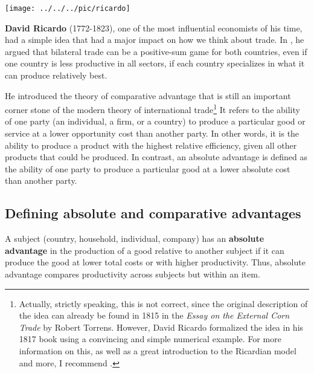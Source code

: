 	\begin{minipage}{0.4\linewidth}
		\begin{center}
			\texttt{[image: ../../../pic/ricardo]}
		\end{center}
	\end{minipage}
	\begin{minipage}{0.6\linewidth}
		\textbf{David Ricardo} (1772-1823), one of the most influential economists of his time, had a simple idea that had a major impact on how we think about trade. In \cite{Ricardo1819}, he argued that bilateral trade can be a positive-sum game for both countries, even if one country is less productive in all sectors, if each country specializes in what it can produce relatively best. 
		
		He introduced the theory of comparative advantage that is still an important corner stone of the modern theory of international trade\footnote{Actually, strictly speaking, this is not correct, since the original description of the idea can already be found in 1815 in the \textit{Essay on the External Corn Trade} by Robert Torrens. However, David Ricardo formalized the idea in his 1817 book using a convincing and simple numerical example. For more information on this, as well as a great introduction to the Ricardian model and more, I recommend \cite{Academy2012International}.} It refers to the ability of one party (an individual, a firm, or a country) to produce a particular good or service at a lower opportunity cost than another party. In other words, it is the ability to produce a product with the highest relative efficiency, given all other products that could be produced. In contrast, an absolute advantage is defined as the ability of one party to produce a particular good at a lower absolute cost than another party.
	\end{minipage}
	
\subsection{Defining absolute and comparative advantages}

A subject (country, household, individual, company) has an \textbf{absolute advantage} in the production of a good relative to another subject if it can produce the good at lower total costs or with higher productivity. Thus, absolute advantage compares productivity across subjects but within an item.

